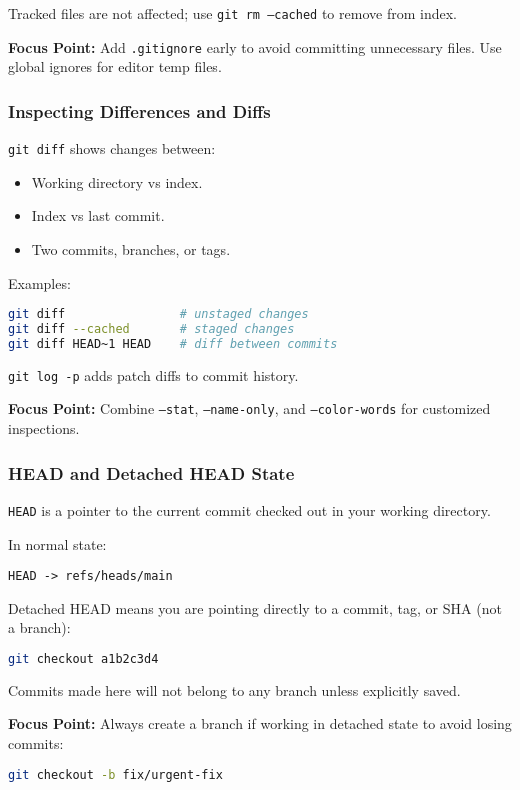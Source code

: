 \documentclass[a4paper,12pt]{article}
\begin{document}
Tracked files are not affected; use \texttt{git rm --cached} to remove from index.

\textbf{Focus Point:} Add \texttt{.gitignore} early to avoid committing unnecessary files. Use global ignores for editor temp files.

\subsubsection{Inspecting Differences and Diffs}

\texttt{git diff} shows changes between:
\begin{itemize}
  \item Working directory vs index.
  \item Index vs last commit.
  \item Two commits, branches, or tags.
\end{itemize}

Examples:
\begin{lstlisting}[language=bash]
git diff                # unstaged changes
git diff --cached       # staged changes
git diff HEAD~1 HEAD    # diff between commits
\end{lstlisting}

\texttt{git log -p} adds patch diffs to commit history.

\textbf{Focus Point:} Combine \texttt{--stat}, \texttt{--name-only}, and \texttt{--color-words} for customized inspections.

\subsubsection{HEAD and Detached HEAD State}

\texttt{HEAD} is a pointer to the current commit checked out in your working directory.

In normal state:
\begin{lstlisting}
HEAD -> refs/heads/main
\end{lstlisting}

Detached HEAD means you are pointing directly to a commit, tag, or SHA (not a branch):

\begin{lstlisting}[language=bash]
git checkout a1b2c3d4
\end{lstlisting}

Commits made here will not belong to any branch unless explicitly saved.

\textbf{Focus Point:} Always create a branch if working in detached state to avoid losing commits:
\begin{lstlisting}[language=bash]
git checkout -b fix/urgent-fix
\end{lstlisting}
\end{document}
